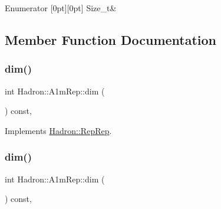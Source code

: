 \begin{DoxyEnumFields}{Enumerator}
[0pt][0pt]{}\mbox{\label{structHadron_1_1A1mRep_ad964ac3420710c762ecc2d3475853e3aa36c9812a16421080e6dfdf2635eaa804}} 
Size\+\_\+t&\\
\hline

\end{DoxyEnumFields}


\subsection{Member Function Documentation}
\mbox{\label{structHadron_1_1A1mRep_a475332da370a6a8c6ad3d24cf3f6d38a}} 
\subsubsection{\texorpdfstring{dim()}{dim()}\hspace{0.1cm}{\footnotesize\ttfamily [1/3]}}
{\footnotesize\ttfamily int Hadron\+::\+A1m\+Rep\+::dim (\begin{DoxyParamCaption}{ }\end{DoxyParamCaption}) const\hspace{0.3cm}{\ttfamily [inline]}, {\ttfamily [virtual]}}



Implements \mbox{\hyperlink{structHadron_1_1RepRep_a92c8802e5ed7afd7da43ccfd5b7cd92b}{Hadron\+::\+Rep\+Rep}}.

\mbox{\label{structHadron_1_1A1mRep_a475332da370a6a8c6ad3d24cf3f6d38a}} 
\subsubsection{\texorpdfstring{dim()}{dim()}\hspace{0.1cm}{\footnotesize\ttfamily [2/3]}}
{\footnotesize\ttfamily int Hadron\+::\+A1m\+Rep\+::dim (\begin{DoxyParamCaption}{ }\end{DoxyParamCaption}) const\hspace{0.3cm}{\ttfamily [inline]}, {\ttfamily [virtual]}}




